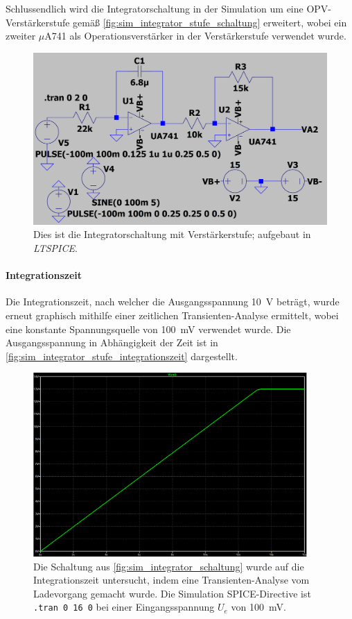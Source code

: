 \documentclass[12pt,english,ngerman]{scrartcl}
\begin{document}
Schlussendlich wird die Integratorschaltung in der Simulation um eine
OPV-Verstärkerstufe gemäß \autoref{fig:sim_integrator_stufe_schaltung}
erweitert, wobei ein zweiter $\mu$A741 als Operationsverstärker in der
Verstärkerstufe verwendet wurde.

\begin{figure}[H]
  \centering
    \includegraphics[width=\linewidth]{./figures/integrator/sim/mit_stufe/schaltung.png}
  \caption{Dies ist die Integratorschaltung mit Verstärkerstufe; aufgebaut in \textit{LTSPICE}.}
  \label{fig:sim_integrator_stufe_schaltung}
\end{figure}

\paragraph{Integrationszeit}
Die Integrationszeit, nach welcher die Ausgangsspannung \SI{10}{\volt} beträgt,
wurde erneut graphisch mithilfe einer zeitlichen Transienten-Analyse ermittelt,
wobei eine konstante Spannungsquelle von \SI{100}{\milli\volt} verwendet wurde.
Die Ausgangsspannung in Abhängigkeit der Zeit ist in
\autoref{fig:sim_integrator_stufe_integrationszeit} dargestellt.

\begin{figure}[H]
  \centering
    \includegraphics[width=\linewidth, height=7cm]{./figures/integrator/sim/mit_stufe/100mv_aus_zeit.png}
  \caption{Die Schaltung aus \autoref{fig:sim_integrator_schaltung} wurde auf
  die Integrationszeit untersucht, indem eine Transienten-Analyse vom
  Ladevorgang gemacht wurde. Die Simulation SPICE-Directive ist \texttt{.tran 0 16 0} 
  bei einer Eingangsspannung $U_e$ von \SI{100}{\milli\volt}.}
  \label{fig:sim_integrator_stufe_integrationszeit}
\end{figure}
\end{document}
